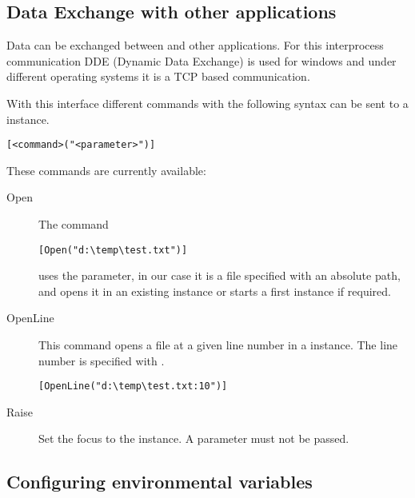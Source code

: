 
\subsection{Data Exchange with other applications}

Data can be exchanged between \codeblocks and other applications. For this interprocess communication DDE (Dynamic Data Exchange) is used for windows and under different operating systems it is a TCP based communication.

With this interface different commands with the following syntax can be sent to a \codeblocks instance.

\begin{lstlisting}
[<command>("<parameter>")]
\end{lstlisting}

These commands are currently available:

\begin{description}
\item[Open] The command

\begin{lstlisting}
[Open("d:\temp\test.txt")]
\end{lstlisting}

uses the parameter, in our case it is a file specified with an absolute path, and opens it in an existing \codeblocks instance or starts a first instance if required.
\item[OpenLine] This command opens a file at a given line number in a \codeblocks instance. The line number is specified with .

\begin{lstlisting}
[OpenLine("d:\temp\test.txt:10")]
\end{lstlisting}

\item[Raise] Set the focus to the \codeblocks instance. A parameter must not be passed.
\end{description}

\subsection{Configuring environmental variables}\label{sec:EnvVars_Cfg}


